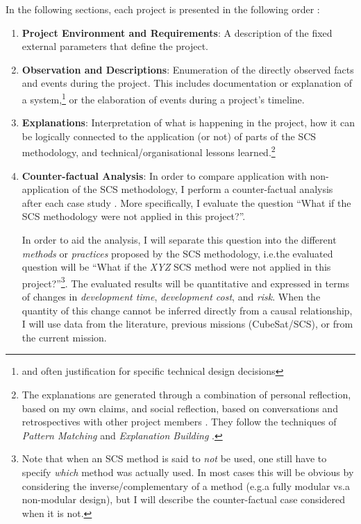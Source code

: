 \documentclass[a4paper,nobib,justified,final]{tufte-book}
\begin{document}
In the following sections, each project is presented in the following order \cite[106]{mcniffYouYourAction2010}:
\begin{enumerate}
	\item \textbf{Project Environment and Requirements}: A description of the fixed external parameters that define the project.
	\item \textbf{Observation and Descriptions}: Enumeration of the directly observed facts and events during the project. This includes documentation or explanation of a system,\footnote{and often justification for specific technical design decisions} or the elaboration of events during a project's timeline.
	\item \textbf{Explanations}: Interpretation of what is happening in the project, how it can be logically connected to the application (or not) of parts of the \acs{SCS} methodology, and technical/organisational lessons learned.\footnote{The explanations are generated through a combination of personal reflection, based on my own claims, and social reflection, based on conversations and retrospectives with other project members \cite[194]{mcniffYouYourAction2010}.
They follow the techniques of \emph{Pattern Matching} and \emph{Explanation Building} \cite[250]{yinCaseStudyResearch2014}.}
	\item \textbf{Counter-factual Analysis}: In order to compare application with non-application of the \acs{SCS} methodology, I perform a counter-factual analysis after each case study \autocite{bennettEventCausationCounterfactual1987}. More specifically, I evaluate the question ``What if the \acs{SCS} methodology were not applied in this project?''.
	
	In order to aid the analysis, I will separate this question into the different \emph{methods} or \emph{practices} proposed by the \acs{SCS} methodology, i.e.\@ the evaluated question will be ``What if the \emph{XYZ} \acs{SCS} method were not applied in this project?''\footnote[][-1cm]{Note that when an \acs{SCS} method is said to \emph{not} be used, one still have to specify \emph{which} method was actually used. In most cases this will be obvious by considering the inverse/complementary of a method (e.g.\@ a fully modular vs.\@ a non-modular design), but I will describe the counter-factual case considered when it is not.}. The evaluated results will be quantitative and expressed in terms of changes in \emph{development time}, \emph{development cost}, and \emph{risk}. When the quantity of this change cannot be inferred directly from a causal relationship, I will use data from the literature, previous missions (CubeSat/\acs{SCS}), or from the current mission. %


\end{enumerate}
\end{document}
